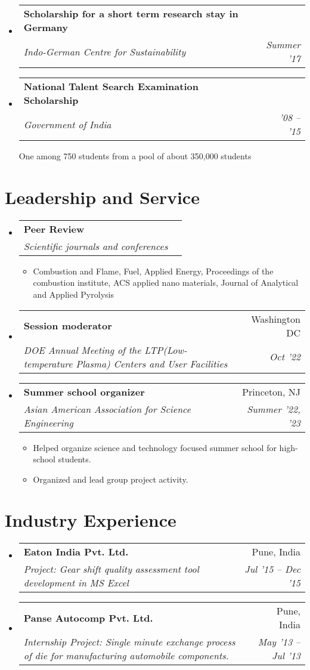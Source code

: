 \documentclass[letterpaper,10pt]{article}
\makeatletter
\newcommand{\resumeSubheading}[4]{
	\vspace{-1pt}\item
	\begin{tabular*}{0.97\textwidth}{l@{\extracolsep{\fill}}r}
		\textbf{#1} & #2 \\
		\textit{\small#3} & \textit{\small #4} \\
	\end{tabular*}\vspace{-5pt}
}
\newcommand{\resumeSubHeadingListStart}{\begin{itemize}[leftmargin=*]}
\newcommand{\resumeSubHeadingListEnd}{\end{itemize}}
\makeatother
\begin{document}
\resumeSubHeadingListStart
\resumeSubheading
{Scholarship for a short term research stay in Germany}{}
{Indo-German Centre for Sustainability}{Summer '17}

\resumeSubheading
{National Talent Search Examination Scholarship}{}
{Government of India}{'08 -- '15}

{One among 750 students from a pool of about 350,000 students}

\resumeSubHeadingListEnd

	\section{Leadership and Service}
\resumeSubHeadingListStart
\resumeSubheading{Peer Review}{}
{Scientific journals and conferences}{}
\begin{itemize}
	\item Combustion and Flame, Fuel, Applied Energy, Proceedings of the combustion institute, ACS applied nano materials, Journal of Analytical and Applied Pyrolysis 
\end{itemize}
\resumeSubheading{Session moderator}{Washington DC}
{DOE Annual Meeting of the LTP(Low-temperature Plasma) Centers and User Facilities}{Oct '22}
\resumeSubheading{Summer school organizer}{Princeton, NJ}
{Asian American Association for Science Engineering}{Summer '22, '23}
\begin{itemize}
	\item Helped organize science and technology focused summer school for high-school students.
	\item Organized and lead group project activity.
\end{itemize}	

\resumeSubHeadingListEnd

\section{Industry Experience}
\resumeSubHeadingListStart
\resumeSubheading{Eaton India Pvt. Ltd.}{Pune, India}
{Project: Gear shift quality assessment tool development in MS Excel}{Jul '15 -- Dec '15}
\resumeSubheading{Panse Autocomp Pvt. Ltd.}{Pune, India}
{Internship Project: Single minute exchange process of die for manufacturing automobile components.}{May '13 -- Jul '13}	
\resumeSubHeadingListEnd	
\end{document}
